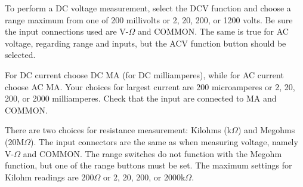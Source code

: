 To perform a DC voltage measurement, select the DCV function and choose a range maximum from one of 200 millivolts or 2, 20, 200, or 1200 volts. Be sure the input connections used are V-$\Omega$ and COMMON. The same is true for AC voltage, regarding range and inputs, but the ACV function button should be selected.

For DC current choose DC MA (for DC milliamperes), while for AC current choose AC MA. Your choices for largest current are 200 microamperes or 2, 20, 200, or 2000 milliamperes. Check that the input are connected to MA and COMMON.

There are two choices for resistance measurement: Kilohms (k$\Omega$) and Megohms (20M$\Omega$). The input connectors are the same as when measuring voltage, namely V-$\Omega$ and COMMON. The range switches do not function with the Megohm function, but one of the range buttons must be set. The maximum settings for Kilohm readings are 200$\Omega$ or 2, 20, 200, or 2000k$\Omega$.


